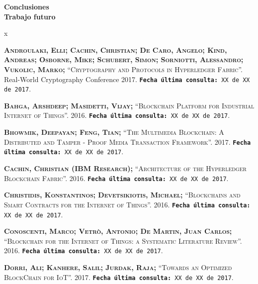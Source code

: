 \documentclass[12pt,a4paper, twoside]{report}
\begin{document}
	{\Large\textbf{Conclusiones}} \\
			
	{\Large\textbf{Trabajo futuro}} \\
			
	\begin{thebibliography} {x}
	
		\pagestyle{empty}
		\thispagestyle{empty}

		\begingroup %
		\raggedright 
		\sloppy
	
		 \textsc{\textbf{Androulaki, Elli; Cachin, Christian; De Caro, Angelo; Kind, Andreas; Osborne, Mike; Schubert, Simon; Sorniotti, Alessandro; Vukolic, Marko; }}\textsc{“Cryptography and Protocols in Hyperledger Fabric”.} Real-World Cryptography Conference 2017.
		\newline \texttt{\textbf{Fecha última consulta:} XX de XX de 2017}.
		
		 \textsc{\textbf{Bahga, Arshdeep; Masidetti, Vijay; }}\textsc{“Blockchain Platform for Industrial Internet of Things”.} 2016.
		\newline \texttt{\textbf{Fecha última consulta:} XX de XX de 2017}.
	
		 \textsc{\textbf{Bhowmik, Deepayan; Feng, Tian; }}\textsc{“The Multimedia Blockchain: A Distributed and Tamper - Proof Media Transaction Framework”.} 2017.
		\newline \texttt{\textbf{Fecha última consulta:} XX de XX de 2017}.

		 \textsc{\textbf{Cachin, Christian (IBM Research); }}\textsc{“Architecture of the Hyperledger Blockchain Fabric”.} 2016. 
		\newline \texttt{\textbf{Fecha última consulta:} XX de XX de 2017}.
		
		 \textsc{\textbf{Christidis, Konstantinos; Devetsikiotis, Michael; }}\textsc{“Blockchains and Smart Contracts for the Internet of Things”.} 2016.
		\newline \texttt{\textbf{Fecha última consulta:} XX de XX de 2017}.

		 \textsc{\textbf{Conoscenti, Marco; Vetrò, Antonio; De Martin, Juan Carlos; }}\textsc{“Blockchain for the Internet of Things: a Systematic Literature Review”.} 2016.
		\newline \texttt{\textbf{Fecha última consulta:} XX de XX de 2017}.
		
		 \textsc{\textbf{Dorri, Ali; Kanhere, Salil; Jurdak, Raja; }}\textsc{“Towards an Optimized BlockChain for IoT”.} 2017.
		\newline \texttt{\textbf{Fecha última consulta:} XX de XX de 2017}.
		

\end{thebibliography}
\end{document}

